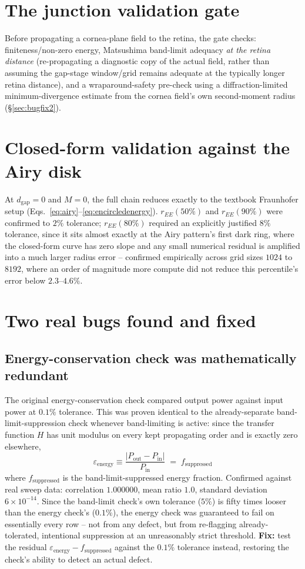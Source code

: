 \documentclass[11pt]{report}
\newcommand{\dgap}{d_{\text{gap}}}
\begin{document}
\section{The junction validation gate}
Before propagating a cornea-plane field to the retina, the gate checks: finiteness/non-zero energy, Matsushima band-limit adequacy \emph{at the retina distance} (re-propagating a diagnostic copy of the actual field, rather than assuming the gap-stage window/grid remains adequate at the typically longer retina distance), and a wraparound-safety pre-check using a diffraction-limited minimum-divergence estimate from the cornea field's own second-moment radius (\S\ref{sec:bugfix2}).

\section{Closed-form validation against the Airy disk}
\label{sec:airyvalidation}
At $\dgap=0$ and $M=0$, the full chain reduces exactly to the textbook Fraunhofer setup (Eqs.~\ref{eq:airy}--\ref{eq:encircledenergy}). $r_{EE}(50\%)$ and $r_{EE}(90\%)$ were confirmed to $2\%$ tolerance; $r_{EE}(80\%)$ required an explicitly justified $8\%$ tolerance, since it sits almost exactly at the Airy pattern's first dark ring, where the closed-form curve has zero slope and any small numerical residual is amplified into a much larger radius error -- confirmed empirically across grid sizes $1024$ to $8192$, where an order of magnitude more compute did not reduce this percentile's error below $2.3$--$4.6\%$.

\section{Two real bugs found and fixed}

\subsection{Energy-conservation check was mathematically redundant}
\label{sec:bugfix1}
The original energy-conservation check compared output power against input power at $0.1\%$ tolerance. This was proven identical to the already-separate band-limit-suppression check whenever band-limiting is active: since the transfer function $H$ has unit modulus on every kept propagating order and is exactly zero elsewhere,
\begin{equation}
\varepsilon_{\text{energy}} \equiv \frac{|P_{\text{out}} - P_{\text{in}}|}{P_{\text{in}}} \;=\; f_{\text{suppressed}}
\end{equation}
where $f_{\text{suppressed}}$ is the band-limit-suppressed energy fraction. Confirmed against real sweep data: correlation $1.000000$, mean ratio $1.0$, standard deviation $6\times10^{-14}$. Since the band-limit check's own tolerance ($5\%$) is fifty times looser than the energy check's ($0.1\%$), the energy check was guaranteed to fail on essentially every row -- not from any defect, but from re-flagging already-tolerated, intentional suppression at an unreasonably strict threshold. \textbf{Fix:} test the residual $\varepsilon_{\text{energy}} - f_{\text{suppressed}}$ against the $0.1\%$ tolerance instead, restoring the check's ability to detect an actual defect.
\end{document}
